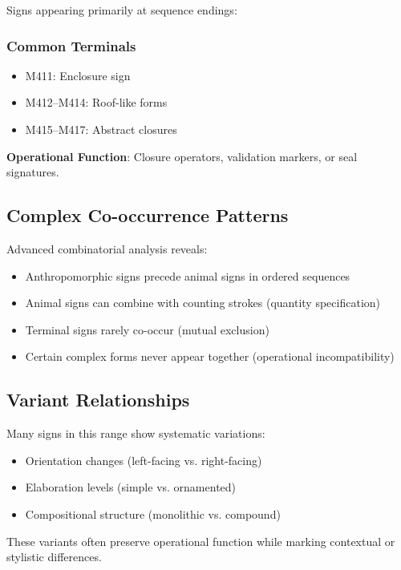 Signs appearing primarily at sequence endings:

\subsubsection{Common Terminals}
\begin{itemize}
    \item M411: Enclosure sign
    \item M412--M414: Roof-like forms
    \item M415--M417: Abstract closures
\end{itemize}

\textbf{Operational Function}: Closure operators, validation markers, or seal signatures.

\subsection{Complex Co-occurrence Patterns}

Advanced combinatorial analysis reveals:

\begin{itemize}
    \item Anthropomorphic signs precede animal signs in ordered sequences
    \item Animal signs can combine with counting strokes (quantity specification)
    \item Terminal signs rarely co-occur (mutual exclusion)
    \item Certain complex forms never appear together (operational incompatibility)
\end{itemize}

\subsection{Variant Relationships}

Many signs in this range show systematic variations:
\begin{itemize}
    \item Orientation changes (left-facing vs. right-facing)
    \item Elaboration levels (simple vs. ornamented)
    \item Compositional structure (monolithic vs. compound)
\end{itemize}

These variants often preserve operational function while marking contextual or stylistic differences.
